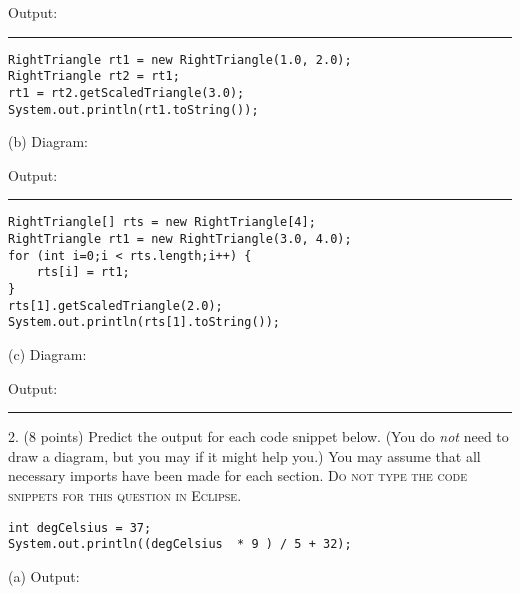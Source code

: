 \documentclass[12pt,twoside]{article}
\newcommand{\fillInBlank}[1][0.5in]{\underline{\hspace{#1}}}
\begin{document}
\vfill
Output: 
\vspace{0.015in}
\hrule
\begin{minipage}[t]{0.55\linewidth}
\begin{lstlisting}
RightTriangle rt1 = new RightTriangle(1.0, 2.0);
RightTriangle rt2 = rt1;
rt1 = rt2.getScaledTriangle(3.0);
System.out.println(rt1.toString());
\end{lstlisting}
\end{minipage}
\hspace{0.25in}
\begin{minipage}[t]{0.3\linewidth}
\vspace{0.05in}
(b) Diagram:
\end{minipage}

\vfill
Output: 
\vspace{0.015in}
\hrule
\vspace{0.02in}
\begin{minipage}[t]{0.58\linewidth}
\begin{lstlisting}
RightTriangle[] rts = new RightTriangle[4];
RightTriangle rt1 = new RightTriangle(3.0, 4.0);
for (int i=0;i < rts.length;i++) {
	rts[i] = rt1;
}
rts[1].getScaledTriangle(2.0);
System.out.println(rts[1].toString());
\end{lstlisting}
\end{minipage}
\hspace{0.25in}
\begin{minipage}[t]{0.3\linewidth}
\vspace{0.05in}
(c) Diagram:
\end{minipage}
\vfill

Output: 
\vspace{0.015in}
\hrule
\clearpage

2. (8 points) Predict the output for each code snippet below. (You do \emph{not} need to draw a diagram, but you may if it might help you.) You may assume that all necessary imports have been made for each section. \textsc{Do not type the code snippets for this question in Eclipse}.
\vspace{0.25in}

\hfill
\begin{minipage}{0.60\linewidth}
\begin{lstlisting}
int degCelsius = 37;
System.out.println((degCelsius  * 9 ) / 5 + 32);
\end{lstlisting}
\end{minipage}
\hspace{0.25in}
(a) Output: \fillInBlank[1in]
\end{document}
